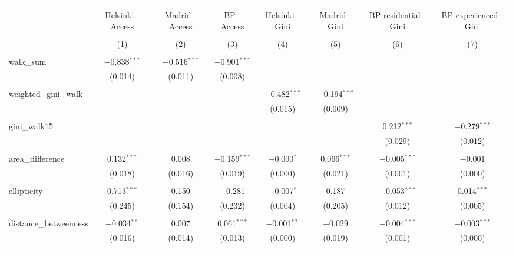 
\begin{table}[!htbp] \centering 
  \caption{} 
  \label{} 
\begin{tabular}{@{\extracolsep{5pt}}lccccccc} 
\\[-1.8ex]\hline 
\hline \\[-1.8ex] 
 & Helsinki - Access & Madrid - Access & BP - Access & Helsinki - Gini & Madrid - Gini & BP residential - Gini & BP experienced - Gini \\ 
\\[-1.8ex] & (1) & (2) & (3) & (4) & (5) & (6) & (7)\\ 
\hline \\[-1.8ex] 
 walk\_sum & $-$0.838$^{***}$ & $-$0.516$^{***}$ & $-$0.901$^{***}$ &  &  &  &  \\ 
  & (0.014) & (0.011) & (0.008) &  &  &  &  \\ 
  & & & & & & & \\ 
 weighted\_gini\_walk &  &  &  & $-$0.482$^{***}$ & $-$0.194$^{***}$ &  &  \\ 
  &  &  &  & (0.015) & (0.009) &  &  \\ 
  & & & & & & & \\ 
 gini\_walk15 &  &  &  &  &  & 0.212$^{***}$ & $-$0.279$^{***}$ \\ 
  &  &  &  &  &  & (0.029) & (0.012) \\ 
  & & & & & & & \\ 
 area\_difference & 0.132$^{***}$ & 0.008 & $-$0.159$^{***}$ & $-$0.000$^{*}$ & 0.066$^{***}$ & $-$0.005$^{***}$ & $-$0.001 \\ 
  & (0.018) & (0.016) & (0.019) & (0.000) & (0.021) & (0.001) & (0.000) \\ 
  & & & & & & & \\ 
 ellipticity & 0.713$^{***}$ & 0.150 & $-$0.281 & $-$0.007$^{*}$ & 0.187 & $-$0.053$^{***}$ & 0.014$^{***}$ \\ 
  & (0.245) & (0.154) & (0.232) & (0.004) & (0.205) & (0.012) & (0.005) \\ 
  & & & & & & & \\ 
 distance\_betweenness & $-$0.034$^{**}$ & 0.007 & 0.061$^{***}$ & $-$0.001$^{**}$ & $-$0.029 & $-$0.004$^{***}$ & $-$0.003$^{***}$ \\ 
  & (0.016) & (0.014) & (0.013) & (0.000) & (0.019) & (0.001) & (0.000) \\ 
  & & & & & & & \\ 

\end{tabular}
\end{table}
